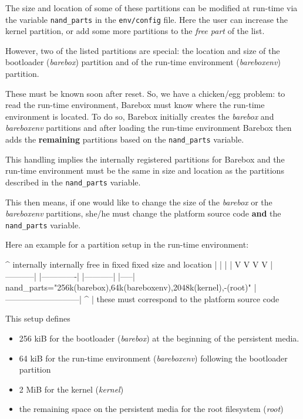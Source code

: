 The size and location of some of these partitions can be modified at run-time
via the variable \texttt{nand_parts} in the \texttt{env/config} file. Here the
user can increase the kernel partition, or add some more partitions to the
\textit{free part} of the list.

However, two of the listed partitions are special: the location and size of
the bootloader (\textit{barebox}) partition and of the run-time environment
(\textit{bareboxenv}) partition.
%
%
%

These must be known soon after reset. So, we have a chicken/egg problem: to
read the run-time environment, Barebox must know where the run-time environment
is located. To do so, Barebox initially creates the \textit{barebox} and
\textit{bareboxenv} partitions and after loading the run-time environment
Barebox then adds the \textbf{remaining} partitions based on the
\texttt{nand_parts} variable.

This handling implies the internally registered partitions for Barebox and the
run-time environment must be the same in size and location as the partitions
described in the \texttt{nand_parts} variable.

This then means, if one would like to change the size of the \textit{barebox}
or the \textit{bareboxenv} partitions, she/he must change the platform source
code \textbf{and} the \texttt{nand_parts} variable.

Here an example for a partition setup in the run-time environment:

\begin{ptxshell}[escapechar=|]{^}
              internally    internally            free in
               fixed          fixed           size and location
                 |              |              |           |
                 V              V              V           V
            |-----------| |-------------| |-----------| |-----|
nand_parts="256k(barebox),64k(bareboxenv),2048k(kernel),-(root)"
            |---------------------------|
                        ^
                        |
              these must correspond to
              the platform source code
\end{ptxshell}

This setup defines

\begin{itemize}
 \item 256 kiB for the bootloader (\textit{barebox}) at the beginning of the
  persistent media.
 \item 64 kiB for the run-time environment (\textit{bareboxenv}) following the
  bootloader partition
 \item 2 MiB for the kernel (\textit{kernel})
 \item the remaining space on the persistent media for the root filesystem
  (\textit{root})
\end{itemize}

